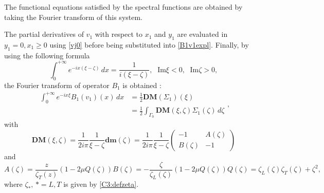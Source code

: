 The functional equations satisfied by the spectral functions are obtained by taking the Fourier transform of this system. 

The partial derivatives of $v_1$ with respect to $x_1$ and $y_1$ are evaluated in  $y_1=0, x_1 \geq 0$ using \eqref{vj0} before being substituted into \eqref{B1v1expl}. Finally, by using the following formula
$$\int_0^{+\infty} e^{-ix(\xi-\zeta)}\,dx=\frac{1}{i(\xi-\zeta)}, \; \mbox{ Im}\xi <0, \;  \mbox{ Im} \zeta>0, $$
the Fourier transform of operator $B_1$ is obtained :
\begin{equation}
\begin{split}
\int_0^{+\infty} e^{-ix\xi}B_1(v_1)(x)\,dx&=\frac{1}{2}\textbf{DM}(\Sigma_1)(\xi) \\
&=\frac{1}{2} \int_{\Gamma_0}\textbf{DM}(\xi,\zeta)\Sigma_1(\zeta)\,d\zeta
\end{split},
\label{B1DM}
\end{equation}
with
\begin{equation}
\textbf{DM}(\xi,\zeta)=\frac{1}{2i\pi} \frac{1}{\xi-\zeta} \textbf{dm}(\zeta) =\frac{1}{2i\pi} \frac{1}{\xi-\zeta} \begin{pmatrix}
-1 & A(\zeta) \\
B(\zeta) & -1
\end{pmatrix}
\label{defDM}
\end{equation}
and
\begin{subequations}
\begin{equation}
A(\zeta)=\frac{z}{\zeta_T(z)}(1-2\mu Q(\zeta))
\end{equation}
\begin{equation}
B(\zeta)=-\frac{\zeta}{\zeta_L(\zeta)}(1-2\mu Q(\zeta))
\end{equation}
\begin{equation}
Q(\zeta)=\zeta_L(\zeta) \zeta_T(\zeta)+\zeta^2,
\end{equation}
\end{subequations}
where $\zeta_*,\, *=L,T$ is given by \eqref{C3:defzeta}.


